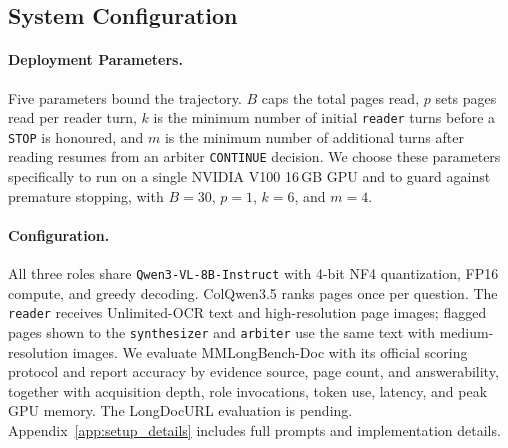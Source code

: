 \documentclass[11pt]{article}
\begin{document}

\subsection{System Configuration}

\paragraph{Deployment Parameters.}
Five parameters bound the trajectory. $B$ caps the total pages read, $p$ sets pages read per reader turn, $k$ is the minimum number of initial \texttt{reader} turns before a \texttt{STOP} is honoured, and $m$ is the minimum number of additional turns after reading resumes from an arbiter \texttt{CONTINUE} decision. We choose these parameters specifically to run on a single NVIDIA V100 16\,GB GPU and to guard against premature stopping, with $B=30$, $p=1$, $k=6$, and $m=4$.

\paragraph{Configuration.}
All three roles share \texttt{Qwen3-VL-8B-Instruct} with 4-bit NF4 quantization, FP16 compute, and greedy decoding. ColQwen3.5 ranks pages once per question. The \texttt{reader} receives Unlimited-OCR text and high-resolution page images; flagged pages shown to the \texttt{synthesizer} and \texttt{arbiter} use the same text with medium-resolution images. We evaluate MMLongBench-Doc with its official scoring protocol and report accuracy by evidence source, page count, and answerability, together with acquisition depth, role invocations, token use, latency, and peak GPU memory. The LongDocURL evaluation is pending. Appendix~\ref{app:setup_details} includes full prompts and implementation details.
\end{document}
